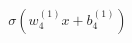 \documentclass[preview]{standalone}
\begin{document}
\begin{align*}
\sigma(w_4^{(1)} x + b_4^{(1)})
\end{align*}
\end{document}
